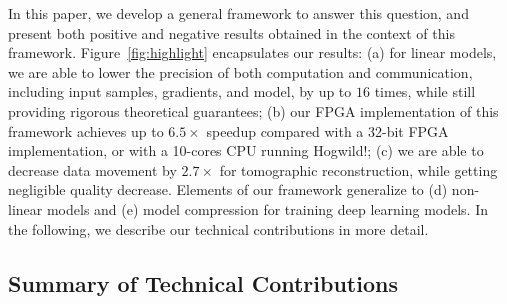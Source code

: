 \documentclass{article}
\begin{document}
In this paper, we develop a general 
framework to answer this question, and
present both  positive and negative results
 obtained in the context of this framework. 
 Figure~\ref{fig:highlight} encapsulates our results: 
(a) for linear models, we are able to lower the precision of both computation and communication, including input samples, gradients, and model, by up to $16$ times, while still providing rigorous theoretical guarantees; 
(b) our FPGA implementation of this framework achieves up to $6.5\times$ speedup compared with
a 32-bit FPGA implementation, or with a 10-cores CPU running Hogwild!;  
(c) we are able to decrease data movement by $2.7\times$ for
tomographic reconstruction, while getting negligible quality decrease. 
Elements of our framework generalize to (d) non-linear models and  (e) model compression for training deep learning models. 
In the following, we describe our technical contributions in more detail. 



\vspace{-1em}
\subsection{Summary of Technical Contributions}
\vspace{-0.5em}
\end{document}
